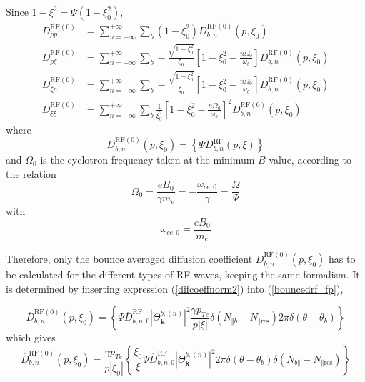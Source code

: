Since $1-\xi^{2}=\Psi\left(  1-\xi_{0}^{2}\right)  $,
\begin{align}
D_{pp}^{\text{RF}(0)}  &  =\sum_{n=-\infty}^{+\infty}\sum_{b}(1-\xi_{0}%
^{2})D_{b,n}^{\text{RF}(0)}(p,\xi_{0})\\
D_{p\xi}^{\text{RF}(0)}  &  =\sum_{n=-\infty}^{+\infty}\sum_{b}-\frac
{\sqrt{1-\xi_{0}^{2}}}{\xi_{0}}\left[  1-\xi_{0}^{2}-\frac{n\Omega_{0}}%
{\omega_{b}}\right]  D_{b,n}^{\text{RF}(0)}(p,\xi_{0})\nonumber\\
D_{\xi p}^{\text{RF}(0)}  &  =\sum_{n=-\infty}^{+\infty}\sum_{b}-\frac
{\sqrt{1-\xi_{0}^{2}}}{\xi_{0}}\left[  1-\xi_{0}^{2}-\frac{n\Omega_{0}}%
{\omega_{b}}\right]  D_{b,n}^{\text{RF}(0)}(p,\xi_{0})\nonumber\\
D_{\xi\xi}^{\text{RF}(0)}  &  =\sum_{n=-\infty}^{+\infty}\sum_{b}\frac{1}%
{\xi_{0}^{2}}\left[  1-\xi_{0}^{2}-\frac{n\Omega_{0}}{\omega_{b}}\right]
^{2}D_{b,n}^{\text{RF}(0)}(p,\xi_{0})\nonumber
\end{align}
where
\begin{equation}
D_{b,n}^{\text{RF}(0)}(p,\xi_{0})=\left\{  \Psi D_{b,n}^{\text{RF}}%
(p,\xi)\right\}  \label{bouncedrf_fp}%
\end{equation}
and $\Omega_{0}$ is the cyclotron frequency taken at the minimum $B$ value,
according to the relation
\begin{equation}
\Omega_{0}=\frac{eB_{0}}{\gamma m_{e}}=-\frac{\omega_{ce,0}}{\gamma}%
=\frac{\Omega}{\Psi} \label{omega0}%
\end{equation}
with
\begin{equation}
\omega_{ce,0}=\frac{eB_{0}}{m_{e}}%
\end{equation}

Therefore, only the bounce averaged diffusion coefficient $D_{b,n}%
^{\text{RF}(0)}(p,\xi_{0})$ has to be calculated for the different types of RF
waves, keeping the same formalism. It is determined by inserting expression
(\ref{difcoeffnorm2}) into (\ref{bouncedrf_fp}),%

\begin{equation}
\overline{D}_{b,n}^{\text{RF}(0)}(p,\xi_{0})=\left\{  \Psi\overline{D}%
_{b,n,0}^{\text{RF}}\left|  \Theta_{\mathbf{k}}^{b,\left(  n\right)  }\right|
^{2}\frac{\gamma p_{Te}}{p\left|  \xi\right|  }\delta\left(  N_{\Vert
b}-N_{\Vert\text{res}}\right)  2\pi\delta\left(  \theta-\theta_{b}\right)
\right\}
\end{equation}
which gives
\begin{equation}
\overline{D}_{b,n}^{\text{RF}(0)}(p,\xi_{0})=\frac{\gamma p_{Te}}{p\left|
\xi_{0}\right|  }\left\{  \frac{\xi_{0}}{\xi}\Psi\overline{D}_{b,n,0}%
^{\text{RF}}\left|  \Theta_{\mathbf{k}}^{b,\left(  n\right)  }\right|
^{2}2\pi\delta\left(  \theta-\theta_{b}\right)  \delta\left(  N_{b\Vert
}-N_{\Vert\text{res}}\right)  \right\}
\end{equation}

